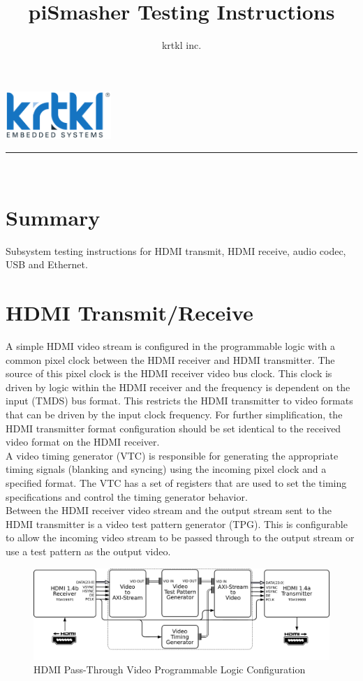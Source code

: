 \documentclass[sfsidenotes, justified]{tufte-handout}
\title{piSmasher Testing Instructions}
\author{krtkl inc.}
\makeatletter
\renewcommand{\maketitle}{%
  \newpage
  \thispagestyle{plain} 
  \begin{fullwidth}
    \par{\LARGE\scshape\@title}
    \hfill
    \includegraphics[width=0.3\textwidth]{images/krtkl.pdf} \\ 
    \rule{\linewidth}{0.5pt} \\
  \end{fullwidth}
}
\makeatother
\begin{document}
  \maketitle
  
  \section{Summary}
  
  Subsystem testing instructions for HDMI transmit, HDMI receive, audio codec, USB and Ethernet.
  
  \tableofcontents
  \listoffigures

	\newpage
  \section{HDMI Transmit/Receive}
  
  A simple HDMI video stream is configured in the programmable logic with a common pixel clock between the HDMI receiver and HDMI transmitter. The source of this pixel clock is the HDMI receiver video bus clock. This clock is driven by logic within the HDMI receiver and the frequency is dependent on the input (TMDS) bus format. This restricts the HDMI transmitter to video formats that can be driven by the input clock frequency. For further simplification, the HDMI transmitter format configuration should be set identical to the received video format on the HDMI receiver. \\
  
  A video timing generator (VTC) is responsible for generating the appropriate timing signals (blanking and syncing) using the incoming pixel clock and a specified format. The VTC has a set of registers that are used to set the timing specifications and control the timing generator behavior. \\
  
  Between the HDMI receiver video stream and the output stream sent to the HDMI transmitter is a video test pattern generator (TPG). This is configurable to allow the incoming video stream to be passed through to the output stream or use a test pattern as the output video.

	\begin{figure}
		\includegraphics{images/hdmi-videotest.pdf}
		\caption{HDMI Pass-Through Video Programmable Logic Configuration}
	\end{figure}
	
\end{document}

